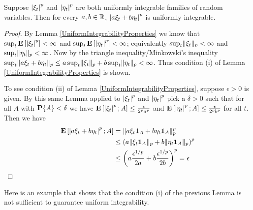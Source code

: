 \begin{lem}\label{SumsOfUniformlyIntegrable}Suppose $\left \vert \xi_t \right \vert^p$ and $\left \vert \eta_t \right \vert^p$ are both uniformly integrable
  families of random variables.  Then for every $a,b \in \mathbb{R}$,
  $\left \vert a\xi_t + b \eta_t \right \vert^p$ is uniformly integrable.
\end{lem}
\begin{proof}
By Lemma \ref{UniformIntegrabilityProperties} we know that $\sup_t
\textbf{E}\left[\left \vert \xi_t \right \vert^p\right] < \infty$ and $\sup_t
\textbf{E}\left[\left \vert \eta_t \right \vert^p\right] < \infty$; equivalently $\sup_t \lVert \xi_t \rVert_p <
\infty$ and $\sup_t \lVert \eta_t \rVert_p < \infty$.  Now by the triangle
inequality/Minkowski's inequality $\sup_t \lVert a\xi_t + b \eta_t \rVert_p
\leq a \sup_t \lVert \xi_t \rVert_p + b \sup_t \lVert \eta_t \rVert_p < \infty$.
Thus condition (i) of Lemma \ref{UniformIntegrabilityProperties} is shown.

To see condition (ii) of Lemma \ref{UniformIntegrabilityProperties},
suppose $\epsilon > 0$ is given.  By this same Lemma applied to
$\left \vert \xi_t \right \vert^p$ and $\left \vert \eta_t \right \vert^p$ pick a $\delta > 0$ such that for
all $A$ with $\textbf{P}\{A\} < \delta$ we have
$\textbf{E}\left[\left \vert \xi_t \right \vert^p ; A\right] \leq \frac{\epsilon}{2^p a^p}$ and 
$\textbf{E}\left[\left \vert \eta_t \right \vert^p ; A\right] \leq \frac{\epsilon}{2^p b^p}$ for all
$t$.  Then
we have
\begin{align*}
\textbf{E}\left[\left \vert a\xi_t + b \eta_t \right \vert^p; A\right] &= \lVert a \xi_t
  \textbf{1}_{A} + b \eta_t \textbf{1}_{A} \rVert_p^p \\
&\leq \left( a\lVert \xi_t \textbf{1}_{A} \rVert_p + b \lVert \eta_t
    \textbf{1}_{A} \rVert_p\right)^p \\
&\leq \left ( a \frac{\epsilon^{1/p}}{2a} + b
  \frac{\epsilon^{1/p}}{2b}\right )^p = \epsilon
\end{align*}
\end{proof}

Here is an example that shows that the condition (i) of the previous
Lemma is not sufficient to guarantee uniform integrability.

